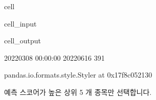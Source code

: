 \documentclass[letterpaper,10pt,english]{jupyterBook}
\begin{document}
\begin{sphinxuseclass}{cell}\begin{sphinxVerbatimInput}

\begin{sphinxuseclass}{cell_input}
\begin{sphinxVerbatim}[commandchars=\\\{\}]
  
\end{sphinxVerbatim}

\end{sphinxuseclass}\end{sphinxVerbatimInput}
\begin{sphinxVerbatimOutput}

\begin{sphinxuseclass}{cell_output}
\begin{sphinxVerbatim}[commandchars=\\\{\}]
2022\PYGZhy{}03\PYGZhy{}08 00:00:00 2022\PYGZhy{}06\PYGZhy{}16
391
\end{sphinxVerbatim}

\begin{sphinxVerbatim}[commandchars=\\\{\}]
\PYGZlt{}pandas.io.formats.style.Styler at 0x17f8c052130\PYGZgt{}
\end{sphinxVerbatim}

\end{sphinxuseclass}\end{sphinxVerbatimOutput}

\end{sphinxuseclass}
\sphinxAtStartPar
 예측 스코어가 높은 상위 5 개 종목만 선택합니다.
\end{document}
